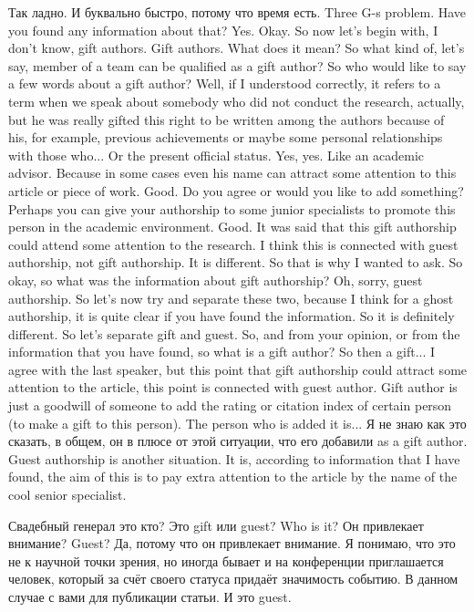 \documentclass[main.tex]{subfiles}
\begin{document}
\newpage
{}

Так ладно.
И буквально быстро, потому что время есть.
Three G-s problem.
Have you found any information about that?
Yes.
Okay.
So now let's begin with, I don't know, gift authors.
Gift authors.
What does it mean?
So what kind of, let's say, member of a team can be qualified as a gift author?
So who would like to say a few words about a gift author?
Well, if I understood correctly, it refers to a term when we speak about somebody who did not conduct the research, actually, but he was really gifted this right to be written among the authors because of his, for example, previous achievements or maybe some personal relationships with those who...
Or the present official status.
Yes, yes.
Like an academic advisor.
Because in some cases even his name can attract some attention to this article or piece of work.
Good.
Do you agree or would you like to add something?
Perhaps you can give your authorship to some junior specialists to promote this person in the academic environment.
Good.
It was said that this gift authorship could attend some attention to the research.
I think this is connected with guest authorship, not gift authorship.
It is different.
So that is why I wanted to ask.
So okay, so what was the information about gift authorship?
Oh, sorry, guest authorship.
So let's now try and separate these two, because I think for a ghost authorship, it is quite clear if you have found the information.
So it is definitely different.
So let's separate gift and guest.
So, and from your opinion, or from the information that you have found, so what is a gift author?
So then a gift...
I agree with the last speaker, but this point that gift authorship could attract some attention to the article, this point is connected with guest author.
Gift author is just a goodwill of someone to add the rating or citation index of certain person (to make a gift to this person).
The person who is added it is...
Я не знаю как это сказать, в общем, он в плюсе от этой ситуации, что его добавили as a gift author.
Guest authorship is another situation.
It is, according to information that I have found, the aim of this is to pay extra attention to the article by the name of the cool senior specialist.

Свадебный генерал это кто?
Это gift или guest?
Who is it?
Он привлекает внимание?
Guest?
Да, потому что он привлекает внимание.
Я понимаю, что это не к научной точки зрения, но иногда бывает и на конференции приглашается человек, который за счёт своего статуса придаёт значимость событию.
В данном случае с вами для публикации статьи.
И это guest.
\end{document}
